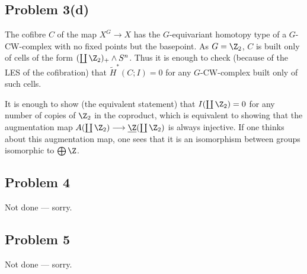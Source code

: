 \documentclass[11pt]{article}
\begin{document}
\subsection*{Problem 3(d)}
The cofibre $C$ of the map $X^G\to X$ has the $G$-equivariant homotopy type of a $G$-CW-complex with no fixed points but the basepoint. As $G=\Z_2$, $C$ is built only of cells of the form $(\coprod\Z_2)_+\wedge S^n$. Thus it is enough to check (because of the LES of the cofibration) that $\widetilde H^*(C;I)=0$ for any $G$-CW-complex built only of such cells.

It is enough to show (the equivalent statement) that $I(\coprod\Z_2)=0$ for any number of copies of $\Z_2$ in the coproduct, which is equivalent to showing that the augmentation map $A(\coprod\Z_2)\to\underline\Z(\coprod\Z_2)$ is always injective. If one thinks about this augmentation map, one sees that it is an isomorphism between groups isomorphic to $\bigoplus\Z$.
\subsection*{Problem 4}
Not done --- sorry.
\subsection*{Problem 5}
Not done --- sorry.
\end{document}
